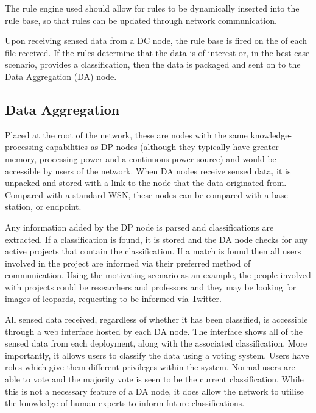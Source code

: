 	The rule engine used should allow for rules to be dynamically inserted into the rule base, so that rules can be updated through network communication.

	Upon receiving sensed data from a DC node, the rule base is fired on the \DIFdelbegin {}\DIFdelend \DIFaddbegin {}\DIFaddend of each file received. If the rules determine that the data is of interest or, in the best case scenario, provides a classification, then the data is packaged and sent on to the Data Aggregation (DA) node.

	\subsection{Data Aggregation}
	Placed at the root of the network, these are nodes with the same knowledge-processing capabilities as DP nodes (although they typically have greater memory, processing power and a continuous power source) and would be accessible by users of the network. When DA nodes receive sensed data, it is unpacked and stored with a link to the node that the data originated from. Compared with a standard WSN, these nodes can be compared with a base station, or endpoint.

	Any information added by the DP node is parsed and classifications are extracted. If a classification is found, it is stored and the DA node checks for any active projects that contain the classification. If a match is found then all users involved in the project are informed via their preferred method of communication. Using the motivating scenario as an example, the people involved with projects could be researchers and professors and they may be looking for images of leopards, requesting to be informed via Twitter.

	All sensed data received, regardless of whether it has been classified, is accessible through a web interface hosted by each DA node. The interface shows all of the sensed data from each deployment, along with the associated classification. More importantly, it allows users to classify the data using a voting system. Users have roles which give them different privileges within the system. Normal users are able to vote and the majority vote is seen to be the current classification. While this is not a necessary feature of a DA node, it does allow the network to utilise the knowledge of human experts to inform future classifications.

